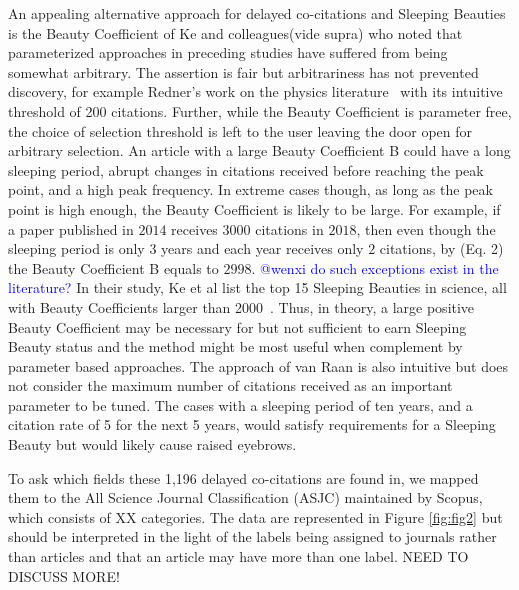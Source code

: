 \documentclass[utf8]{frontiersSCNS}
\begin{document}
An appealing alternative approach for delayed co-citations and Sleeping Beauties is the Beauty Coefficient of Ke and colleagues(vide supra) who noted that parameterized approaches in preceding studies have suffered from being somewhat arbitrary. The assertion is fair but arbitrariness has not prevented discovery, for example Redner's work on the physics literature~\citep{redner_2005} with its intuitive threshold of 200 citations. Further, while the Beauty Coefficient is parameter free, the choice of selection threshold is left to the user leaving the door open for arbitrary selection. An article with a large Beauty Coefficient B could have a long sleeping period, abrupt changes in citations received before reaching the peak point, and a high peak frequency. In extreme cases though, as long as the peak point is high enough, the Beauty Coefficient is likely to be large. For example, if a paper published in $2014$ receives $3000$ citations in $2018$, then even though the sleeping period is only $3$ years and each year receives only $2$ citations, by (Eq. 2) the Beauty Coefficient B equals to $2998$. \textcolor{blue}{@wenxi do such exceptions exist in the literature?} In their study, Ke et al list the top 15 Sleeping Beauties in science, all with Beauty Coefficients larger than 2000~\citep{Ke2015}. Thus, in theory, a large positive Beauty Coefficient may be necessary for but not sufficient to earn Sleeping Beauty status and the method might be most useful when complement by parameter based approaches. The approach of van Raan is also intuitive but does not consider the maximum number of citations received as an important parameter to be tuned.  The cases with a sleeping period of ten years, and a citation rate of 5 for the next 5 years, would satisfy requirements for a Sleeping Beauty but would  likely cause raised eyebrows. 

To ask which fields these 1,196 delayed co-citations are found in, we mapped them to the All Science Journal Classification (ASJC) maintained by Scopus, which consists of XX categories.  The data are represented in Figure \ref{fig:fig2} but should be interpreted in the light of the labels being assigned to journals rather than articles and that an article may have more than one label. NEED TO DISCUSS MORE!
\end{document}
